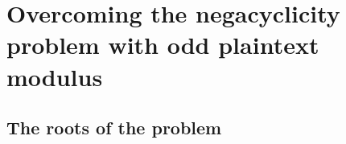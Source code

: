 \chapter{Overcoming the negacyclicity problem with odd plaintext modulus}


\section{The roots of the problem}



